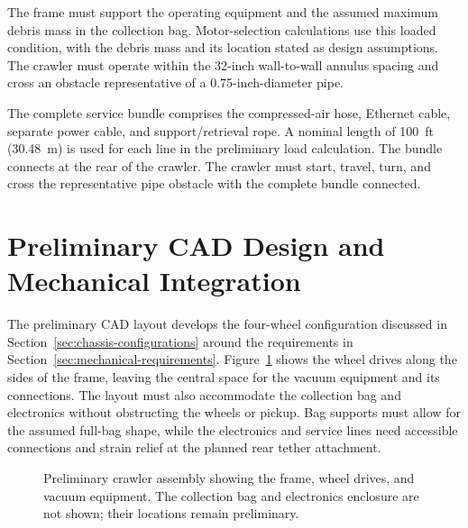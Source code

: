 The frame must support the operating equipment and the assumed maximum debris mass in the collection bag. Motor-selection calculations use this loaded condition, with the debris mass and its location stated as design assumptions. The crawler must operate within the 32-inch wall-to-wall annulus spacing and cross an obstacle representative of a 0.75-inch-diameter pipe.

The complete service bundle comprises the compressed-air hose, Ethernet cable, separate power cable, and support/retrieval rope. A nominal length of 100~ft (30.48~m) is used for each line in the preliminary load calculation. The bundle connects at the rear of the crawler. The crawler must start, travel, turn, and cross the representative pipe obstacle with the complete bundle connected.
\section{Preliminary CAD Design and Mechanical Integration}
\label{sec:crawler-cad}
The preliminary CAD layout develops the four-wheel configuration discussed in Section~\ref{sec:chassis-configurations} around the requirements in Section~\ref{sec:mechanical-requirements}. Figure~\ref{fig:crawler-assembly-cad} shows the wheel drives along the sides of the frame, leaving the central space for the vacuum equipment and its connections. The layout must also accommodate the collection bag and electronics without obstructing the wheels or pickup. Bag supports must allow for the assumed full-bag shape, while the electronics and service lines need accessible connections and strain relief at the planned rear tether attachment.

\begin{figure}[htbp]
\centering
{}
\caption[Preliminary crawler assembly]{Preliminary crawler assembly showing the frame, wheel drives, and vacuum equipment. The collection bag and electronics enclosure are not shown; their locations remain preliminary.}
\label{fig:crawler-assembly-cad}
\end{figure}


